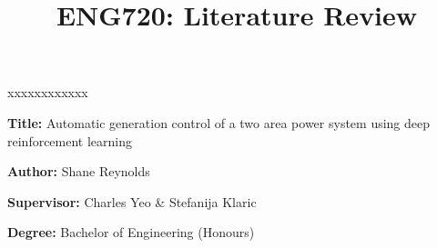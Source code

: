 \documentclass[12pt]{article}
\title{ENG720: Literature Review}
\author{}
\date{}
\begin{document}
	\maketitle

	\begin{namelist}{xxxxxxxxxxxx}
		\item[{\bf Title:}]
			Automatic generation control of a two area power system using deep reinforcement learning
		\item[{\bf Author:}]
			Shane Reynolds
		\item[{\bf Supervisor:}]
			Charles Yeo \& Stefanija Klaric
		\item[{\bf Degree:}]
			Bachelor of Engineering (Honours)
	\end{namelist}

	 {}
	\tableofcontents
	\newpage

	

    \cleardoublepage
      {}                    
    \printbibliography
    
\end{document}
